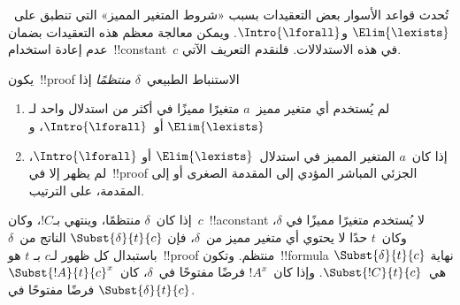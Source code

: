 \documentclass[../../../include/open-logic-section]{subfiles}
\begin{document}


تُحدث قواعد الأسوار بعض التعقيدات بسبب «شروط المتغير المميز» التي تنطبق
على~$\Elim{\lexists}$ و$\Intro{\lforall}$. ويمكن معالجة معظم هذه
التعقيدات بضمان عدم إعادة استخدام~!!{constant}~$c$ في هذه
الاستدلالات. فلنقدم التعريف الآتي.

\begin{defn}
يكون~!!{proof} الاستنباط الطبيعي~$\delta$ \emph{منتظمًا} إذا
\begin{enumerate}
  \item لم يُستخدم أي متغير مميز~$a$ متغيرًا مميزًا في أكثر من
  استدلال واحد لـ$\Elim{\lexists}$ أو~$\Intro{\lforall}$، و
  \item إذا كان~$a$ المتغير المميز في استدلال~$\Elim{\lexists}$ أو
  $\Intro{\lforall}$، لم يظهر إلا في~!!{proof} الجزئي المباشر المؤدي
  إلى المقدمة الصغرى أو إلى المقدمة، على الترتيب.
\end{enumerate}
\end{defn}

\begin{lem} إذا كان~$\delta$ منتظمًا،
وينتهي بـ$!C$، وكان~$c$~!!a{constant} لا يُستخدم متغيرًا مميزًا في
$\delta$، وكان~$t$ حدًا لا يحتوي أي متغير مميز من~$\delta$، فإن
$\Subst{\delta}{t}{c}$ الناتج من~$\delta$ باستبدال كل ظهور لـ$c$ بـ
$t$ هو~!!{proof} منتظم. وتكون~!!{formula} نهاية
$\Subst{\delta}{t}{c}$ هي~$\Subst{!C}{t}{c}$. وإذا كان~$!A^x$ فرضًا
مفتوحًا في~$\delta$، كان~$\Subst{!A}{t}{c}^x$ فرضًا مفتوحًا في
$\Subst{\delta}{t}{c}$.
\end{lem}
\end{document}
